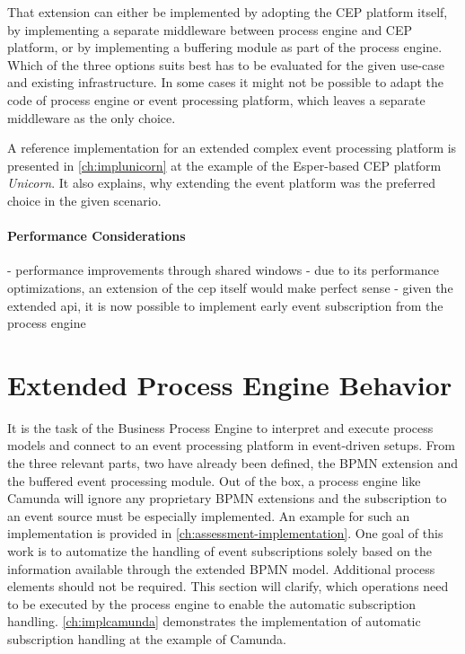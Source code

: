That extension can either be implemented by adopting the CEP platform itself, by implementing a separate middleware between process engine and CEP platform, or by implementing a buffering module as part of the process engine.
Which of the three options suits best has to be evaluated for the given use-case and existing infrastructure. In some cases it might not be possible to adapt the code of process engine or event processing platform, which leaves a separate middleware as the only choice.

A reference implementation for an extended complex event processing platform is presented in \autoref{ch:implunicorn} at the example of the Esper-based CEP platform \textit{Unicorn}. It also explains, why extending the event platform was the preferred choice in the given scenario.

\paragraph{Performance Considerations}
- performance improvements through shared windows
- due to its performance optimizations, an extension of the cep itself would make perfect sense
- given the extended api, it is now possible to implement early event subscription from the process engine 


\section{Extended Process Engine Behavior}\label{ch:extendedprocessengine}
It is the task of the Business Process Engine to interpret and execute process models and connect to an event processing platform in event-driven setups.
From the three relevant parts, two have already been defined, the BPMN extension and the buffered event processing module.
Out of the box, a process engine like Camunda will ignore any proprietary BPMN extensions and the subscription to an event source must be especially implemented. An example for such an implementation is provided in \autoref{ch:assessment-implementation}.
One goal of this work is to automatize the handling of event subscriptions solely based on the information available through the extended BPMN model. Additional process elements should not be required.
This section will clarify, which operations need to be executed by the process engine to enable the automatic subscription handling.
\autoref{ch:implcamunda} demonstrates the implementation of automatic subscription handling at the example of Camunda.

